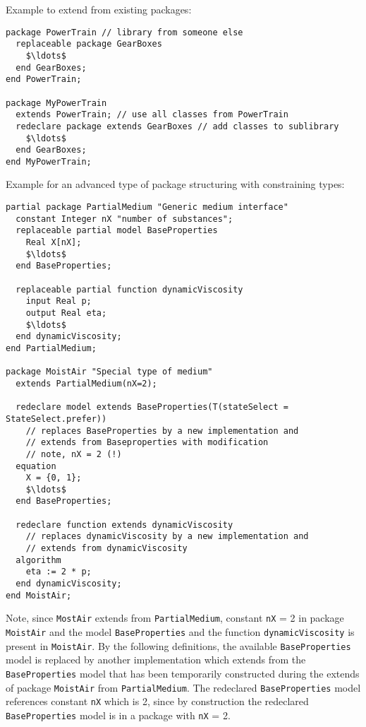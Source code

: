 \begin{nonnormative}
Example to extend from existing packages:
\begin{lstlisting}[language=modelica]
package PowerTrain // library from someone else
  replaceable package GearBoxes
    $\ldots$
  end GearBoxes;
end PowerTrain;

package MyPowerTrain
  extends PowerTrain; // use all classes from PowerTrain
  redeclare package extends GearBoxes // add classes to sublibrary
    $\ldots$
  end GearBoxes;
end MyPowerTrain;
\end{lstlisting}

Example for an advanced type of package structuring with constraining types:
\begin{lstlisting}[language=modelica]
partial package PartialMedium "Generic medium interface"
  constant Integer nX "number of substances";
  replaceable partial model BaseProperties
    Real X[nX];
    $\ldots$
  end BaseProperties;

  replaceable partial function dynamicViscosity
    input Real p;
    output Real eta;
    $\ldots$
  end dynamicViscosity;
end PartialMedium;

package MoistAir "Special type of medium"
  extends PartialMedium(nX=2);

  redeclare model extends BaseProperties(T(stateSelect = StateSelect.prefer))
    // replaces BaseProperties by a new implementation and
    // extends from Baseproperties with modification
    // note, nX = 2 (!)
  equation
    X = {0, 1};
    $\ldots$
  end BaseProperties;

  redeclare function extends dynamicViscosity
    // replaces dynamicViscosity by a new implementation and
    // extends from dynamicViscosity
  algorithm
    eta := 2 * p;
  end dynamicViscosity;
end MoistAir;
\end{lstlisting}

Note, since \lstinline!MostAir! extends from \lstinline!PartialMedium!,
constant \lstinline!nX! = 2 in package \lstinline!MoistAir! and the model
\lstinline!BaseProperties! and the function \lstinline!dynamicViscosity! is present
in \lstinline!MoistAir!. By the following definitions, the available
\lstinline!BaseProperties! model is replaced by another implementation which
extends from the \lstinline!BaseProperties! model that has been temporarily
constructed during the extends of package \lstinline!MoistAir! from
\lstinline!PartialMedium!. The redeclared \lstinline!BaseProperties! model
references constant \lstinline!nX! which is 2, since by construction the
redeclared \lstinline!BaseProperties! model is in a package with \lstinline!nX! = 2.


\end{nonnormative}
